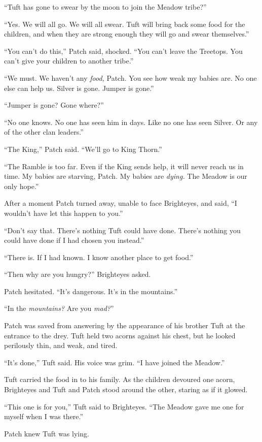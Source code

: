\documentclass[ebook,oneside,openany,12pt]{memoir}
\begin{document}
“Tuft has gone to swear by the moon to join the Meadow tribe?”

“Yes. We will all go. We will all swear. Tuft will bring back some
food for the children, and when they are strong enough they will go
and swear themselves.”

“You can’t do this,” Patch said, shocked. “You can’t leave the
Treetops. You can’t give your children to another tribe.”

“We must. We haven’t any \emph{food,} Patch. You see how weak my
babies are. No one else can help us. Silver is gone. Jumper is gone.”

“Jumper is gone? Gone where?”

“No one knows. No one has seen him in days. Like no one has seen
Silver. Or any of the other clan leaders.”

“The King,” Patch said. “We’ll go to King Thorn.”

“The Ramble is too far. Even if the King sends help, it will never
reach us in time. My babies are starving, Patch. My babies are
\emph{dying.} The Meadow is our only hope.”

After a moment Patch turned away, unable to face Brighteyes, and said,
“I wouldn’t have let this happen to you.”

“Don’t say that. There’s nothing Tuft could have done. There’s nothing
you could have done if I had chosen you instead.”

“There is. If I had known. I know another place to get food.”

“Then why are you hungry?” Brighteyes asked.

Patch hesitated. “It’s dangerous. It’s in the mountains.”

“In the \emph{mountains?} Are you \emph{mad?}”

Patch was saved from answering by the appearance of his brother Tuft
at the entrance to the drey. Tuft held two acorns against his chest,
but he looked perilously thin, and weak, and tired.

“It’s done,” Tuft said. His voice was grim. “I have joined the
Meadow.”

Tuft carried the food in to his family. As the children devoured one
acorn, Brighteyes and Tuft and Patch stood around the other, staring
as if it glowed.

“This one is for you,” Tuft said to Brighteyes. “The Meadow gave me
one for myself when I was there.”

Patch knew Tuft was lying.
\end{document}
